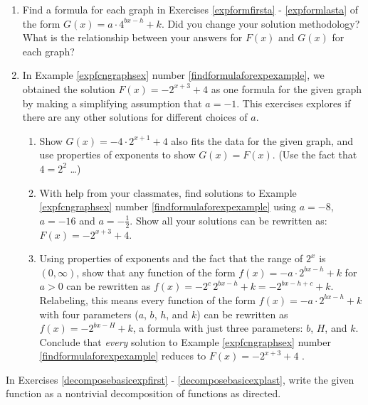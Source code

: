 \documentclass{ximera}
\begin{document}
\begin{enumerate}
\setcounter{enumi}{\value{HW}}


\item 

Find a formula for each graph in Exercises \ref{expformfirsta} - \ref{expformlasta} of the form $G(x) = a \cdot 4^{bx-h} + k$.
  Did you change your solution methodology?    What is the relationship between your answers for $F(x)$ and $G(x)$ for each graph?

\item \label{morethanoneforexpexercise} In Example \ref{expfcngraphsex} number \ref{findformulaforexpexample}, we obtained the solution  $F(x) = -2^{x+3} + 4$ as one formula for the given graph by making a simplifying assumption that $a = -1$.  This exercises explores if there are any other solutions for different choices of $a$.

\begin{enumerate}

\item  Show  $G(x) = -4 \cdot 2^{x+1} + 4$ also fits the data for the given graph, and use  properties of exponents to show $G(x) = F(x)$.  (Use the fact that $4 = 2^2$ \ldots)

\item With help from your classmates, find solutions to  Example \ref{expfcngraphsex} number \ref{findformulaforexpexample} using $a = -8$, $a = -16$ and  $a = -\frac{1}{2}$.  Show all your solutions can be rewritten as: $F(x) = -2^{x+3} + 4$.

\item  Using properties of exponents and the fact that the range of $2^{x}$ is $(0, \infty)$, show that any function of the form $f(x) = -a \cdot 2^{bx-h} + k$ for $a> 0$ can be rewritten as $f(x) = - 2^{c} \, 2^{bx-h} + k = -2^{bx-h+c} + k$.  Relabeling, this means every function of the form $f(x) = -a \cdot 2^{bx-h} + k$ with four parameters ($a$, $b$, $h$, and $k$) can be rewritten as $f(x) =  - 2^{bx - H} + k$, a formula with just three parameters:  $b$, $H$, and $k$.  Conclude that  \textit{every} solution to Example \ref{expfcngraphsex} number \ref{findformulaforexpexample} reduces to $F(x) = -2^{x+3} + 4$ .

\end{enumerate}
\setcounter{HW}{\value{enumi}}
\end{enumerate}

In Exercises \ref{decomposebasicexpfirst} - \ref{decomposebasicexplast}, write the given function as a nontrivial decomposition of functions as directed.
\end{document}
